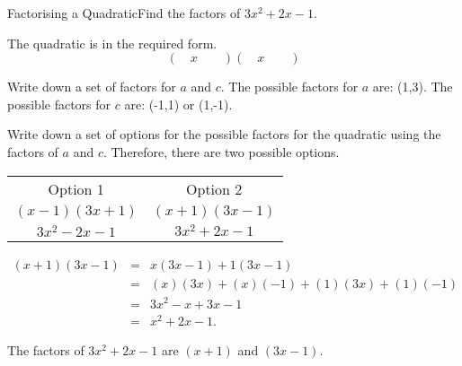 \documentclass[10pt,a4paper,titlepage,twoside,openright]{report}
\begin{document}
\begin{wex}{Factorising a Quadratic}{Find the factors of $3x^2+2x-1$.}{
The quadratic is in the required form.
\begin{equation}
(\quad x\qquad)(\quad x\qquad)
\end{equation}

\item{Write down a set of factors for $a$ and $c$.}
The possible factors for $a$ are: (1,3).
The possible factors for $c$ are: (-1,1) or (1,-1).

\item{Write down a set of options for the possible factors for the quadratic using the factors of $a$ and $c$.}
Therefore, there are two possible options.
\begin{center}
\begin{tabular}{cc}
Option 1 & Option 2\\
$(x-1)(3x+1)$&
$(x+1)(3x-1)$\\
$3x^2-2x-1$&
\underline{$3x^2+2x-1$}\\
\end{tabular}
\end{center}

\begin{eqnarray*}
(x+1)(3x-1)&=&x(3x-1)+1(3x-1)\\
&=&(x)(3x) +(x)(-1) +(1)(3x) +(1)(-1)\\
&=&3x^2 -x +3x -1\\
&=&x^2 +2x -1.
\end{eqnarray*}

The factors of $3x^2+2x-1$ are $(x+1)$ and $(3x-1)$.
}\end{wex}
\end{document}
